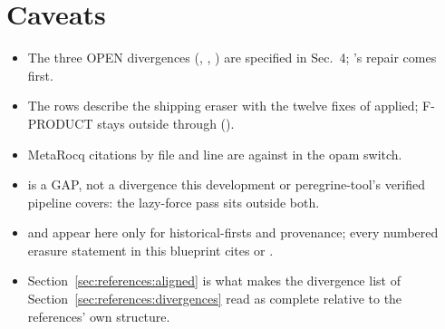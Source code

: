 \section*{Caveats}

\begin{itemize}
\item The three OPEN divergences (, , ) are specified in
 Sec.\ 4; 's repair comes first.
\item The rows describe the shipping eraser with the twelve fixes of
 applied; F-PRODUCT stays outside through 
().
\item MetaRocq citations by file and line are against 
in the  opam switch.
\item {} is a GAP, not a divergence this development or peregrine-tool's verified pipeline
covers: the lazy-force pass sits outside both.
\item {} and  appear here only for historical-firsts and provenance; every
numbered erasure statement in this blueprint cites  or .
\item Section~\ref{sec:references:aligned} is what makes the divergence list of
Section~\ref{sec:references:divergences} read as complete relative to the references' own structure.
\end{itemize}
